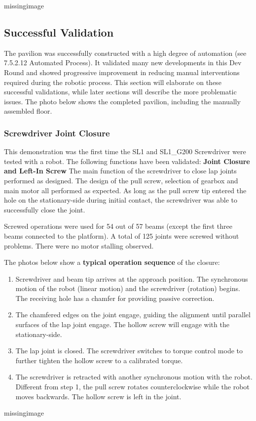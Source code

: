 missingimage

\subsection{Successful Validation}
The pavilion was successfully constructed with a high degree of automation (see 7.5.2.12 Automated Process). It validated many new developments in this Dev Round and showed progressive improvement in reducing manual interventions required during the robotic process. This section will elaborate on these successful validations, while later sections will describe the more problematic issues.
The photo below shows the completed pavilion, including the manually assembled floor.

\subsubsection{Screwdriver Joint Closure}
This demonstration was the first time the SL1 and SL1\_G200 Screwdriver were tested with a robot. The following functions have been validated:
\textbf{Joint Closure and Left-In Screw}
The main function of the screwdriver to close lap joints performed as designed. The design of the pull screw, selection of gearbox and main motor all performed as expected. As long as the pull screw tip entered the hole on the stationary-side during initial contact, the screwdriver was able to successfully close the joint. 

Screwed operations were used for 54 out of 57 beams (except the first three beams connected to the platform). A total of 125 joints were screwed without problems. There were no motor stalling observed.

The photos below show a \textbf{typical operation sequence }of the closure:
\begin{enumerate}
    \item Screwdriver and beam tip arrives at the approach position. The synchronous motion of the robot (linear motion) and the screwdriver (rotation) begins. The receiving hole has a chamfer for providing passive correction.
    \item The chamfered edges on the joint engage, guiding the alignment until parallel surfaces of the lap joint engage. The hollow screw will engage with the stationary-side.
    \item The lap joint is closed. The screwdriver switches to torque control mode to further tighten the hollow screw to a calibrated torque.
    \item The screwdriver is retracted with another synchronous motion with the robot. Different from step 1, the pull screw rotates counterclockwise while the robot moves backwards. The hollow screw is left in the joint.
\end{enumerate}
missingimage

